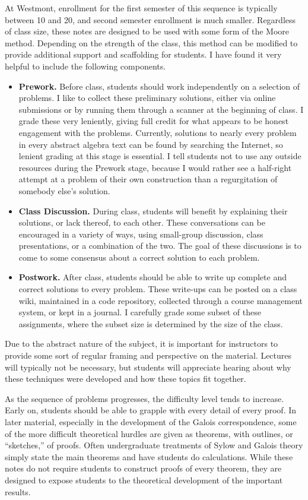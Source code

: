 \begin{annotation}
At Westmont, enrollment for the first semester of this sequence is typically between 10 and 20, and second semester enrollment is much smaller. Regardless of class size, these notes are designed to be used with some form of the Moore method. Depending on the strength of the class, this method can be modified to provide additional support and scaffolding for students. I have found it very helpful to include the following components.
\begin{itemize}
    \item \textbf{Prework.} Before class, students should work independently on a selection of problems. I like to collect these preliminary solutions, either via online submissions or by running them through a scanner at the beginning of class. I grade these very leniently, giving full credit for what appears to be honest engagement with the problems. Currently, solutions to nearly every problem in every abstract algebra text can be found by searching the Internet, so lenient grading at this stage is essential. I tell students not to use any outside resources during the Prework stage, because I would rather see a half-right attempt at a problem of their own construction than a regurgitation of somebody else's solution.
    \item \textbf{Class Discussion.} During class, students will benefit by explaining their solutions, or lack thereof, to each other. These conversations can be encouraged in a variety of ways, using small-group discussion, class presentations, or a combination of the two. The goal of these discussions is to come to some consensus about a correct solution to each problem.
    \item \textbf{Postwork.} After class, students should be able to write up complete and correct solutions to every problem. These write-ups can be posted on a class wiki, maintained in a code repository, collected through a course management system, or kept in a journal. I carefully grade some subset of these assignments, where the subset size is determined by the size of the class.
\end{itemize}

Due to the abstract nature of the subject, it is important for instructors to provide some sort of regular framing and perspective on the material. Lectures will typically not be necessary, but students will appreciate hearing about why these techniques were developed and how these topics fit together.

As the sequence of problems progresses, the difficulty level tends to increase. Early on, students should be able to grapple with every detail of every proof. In later material, especially in the development of the Galois correspondence, some of the more difficult theoretical hurdles are given as theorems, with outlines, or ``sketches,'' of proofs. Often undergraduate treatments of Sylow and Galois theory simply state the main theorems and have students do calculations. While these notes do not require students to construct proofs of every theorem, they are designed to expose students to the theoretical development of the important results.


\end{annotation}
